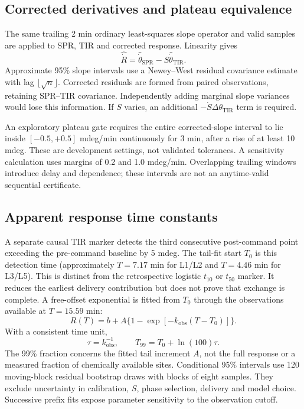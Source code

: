 \documentclass[lettersize,journal]{IEEEtran}
\begin{document}
\subsection{Corrected derivatives and plateau equivalence}
The same trailing 2 min ordinary least-squares slope operator and valid
samples are applied to SPR, TIR and corrected response. Linearity gives
\begin{equation}\label{eq:slope}
 \widehat{\dot R}=\widehat{\dot\theta}_{\mathrm{SPR}}
      -S\widehat{\dot\theta}_{\mathrm{TIR}}.
\end{equation}
Approximate 95\% slope intervals use a Newey--West residual covariance
estimate with lag $\lfloor\sqrt n\rfloor$. Corrected residuals are formed
from paired observations, retaining SPR--TIR covariance. Independently
adding marginal slope variances would lose this information. If $S$ varies,
an additional $-\dot S\Delta\theta_{\mathrm{TIR}}$ term is required.

An exploratory plateau gate requires the entire corrected-slope interval to
lie inside $[-0.5,+0.5]$ mdeg/min continuously for 3 min, after a rise of at
least 10 mdeg. These are development settings, not validated tolerances.
A sensitivity calculation uses margins of 0.2 and 1.0 mdeg/min. Overlapping
trailing windows introduce delay and dependence; these intervals are not
an anytime-valid sequential certificate.

\subsection{Apparent response time constants}
A separate causal TIR marker detects the third consecutive post-command
point exceeding the pre-command baseline by 5 mdeg. The tail-fit start
$T_0$ is this detection time (approximately $T=7.17$ min for L1/L2 and $T=4.46$ min
for L3/L5). This is distinct from the retrospective logistic $t_{10}$ or
$t_{50}$ marker. It reduces the earliest delivery contribution but does not
prove that exchange is complete. A free-offset exponential is fitted from
$T_0$ through the observations available at $T=15.59$ min:
\begin{equation}\label{eq:tail}
 R(T)=b+A\{1-\exp[-k_{\mathrm{obs}}(T-T_0)]\}.
\end{equation}
With a consistent time unit,
\begin{equation}
 \tau=k_{\mathrm{obs}}^{-1},\qquad
 T_{99}=T_0+\ln(100)\tau .
\end{equation}
The 99\% fraction concerns the fitted tail increment $A$, not the full
response or a measured fraction of chemically available sites. Conditional
95\% intervals use 120 moving-block residual bootstrap draws with blocks
of eight samples. They exclude uncertainty in calibration, $S$, phase
selection, delivery and model choice. Successive prefix fits expose
parameter sensitivity to the observation cutoff.
\end{document}
